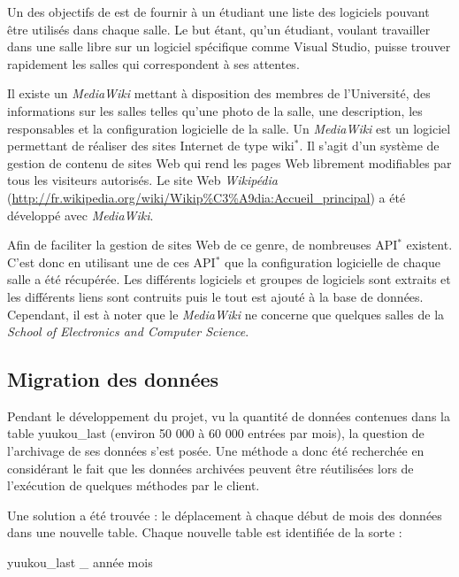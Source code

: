 Un des objectifs de {\YuukouII} est de fournir \`a un \'etudiant une liste des logiciels pouvant \^etre utilis\'es dans chaque salle.
Le but \'etant, qu'un \'etudiant, voulant travailler dans une salle libre sur un logiciel sp\'ecifique comme Visual Studio, puisse trouver rapidement les salles qui correspondent \`a ses attentes.

Il existe un \textit{MediaWiki} mettant \`a disposition des membres de l'Universit\'e, des informations sur les salles telles qu'une photo de la salle, une description, les responsables et la configuration logicielle de la salle.
Un \textit{MediaWiki} est un logiciel permettant de r\'ealiser des sites Internet de type wiki$^*$. 
Il s'agit d'un syst\`eme de gestion de contenu de sites Web qui rend les pages Web librement modifiables par tous les visiteurs autoris\'es.
Le site Web \textit{Wikip\'edia} (\url{http://fr.wikipedia.org/wiki/Wikip\%C3\%A9dia:Accueil\_principal}) a \'et\'e d\'evelopp\'e avec \textit{MediaWiki}.

Afin de faciliter la gestion de sites Web de ce genre, de nombreuses API$^*$ existent.
C'est donc en utilisant une de ces API$^*$ que la configuration logicielle de chaque salle a \'et\'e r\'ecup\'er\'ee.
Les diff\'erents logiciels et groupes de logiciels sont extraits et les diff\'erents liens sont contruits puis le tout est ajout\'e \`a la base de donn\'ees.
Cependant, il est \`a noter que le \textit{MediaWiki} ne concerne que quelques salles de la \textit{School of Electronics and Computer Science}.

\subsection{Migration des donn\'ees}
\label{section:migrationDonnees}

Pendant le d\'eveloppement du projet, vu la quantit\'e de donn\'ees contenues dans la table \textsf{yuukou\_last} (environ 50 000 \`a 60 000 entr\'ees par mois), la question de l'archivage de ses donn\'ees s'est pos\'ee.
Une m\'ethode a donc \'et\'e recherch\'ee en consid\'erant le fait que les donn\'ees archiv\'ees peuvent \^etre r\'eutilis\'ees lors de l'ex\'ecution de quelques m\'ethodes par le client.

Une solution a \'et\'e trouv\'ee : le d\'eplacement \`a chaque d\'ebut de mois des donn\'ees dans une nouvelle table.
Chaque nouvelle table est identifi\'ee de la sorte : 

\begin{center}
	\textsf{yuukou\_last \_ ann\'ee mois}

\end{center}

